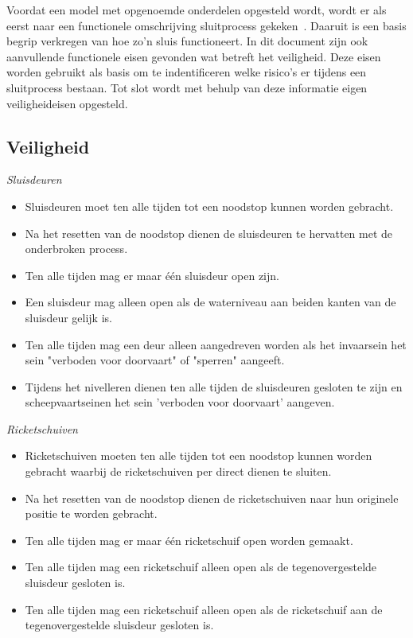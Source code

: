 \documentclass{article}
\begin{document}
    \noindent Voordat een model met opgenoemde onderdelen opgesteld wordt, wordt er als 
    eerst naar een functionele omschrijving sluitprocess gekeken~\cite{functioneel}. 
    Daaruit is een basis begrip verkregen van hoe zo'n sluis functioneert. In dit
    document zijn ook aanvullende functionele eisen gevonden wat betreft het 
    veiligheid. Deze eisen worden gebruikt als basis om te indentificeren welke 
    risico's er tijdens een sluitprocess bestaan. Tot slot wordt met behulp van
    deze informatie eigen veiligheideisen opgesteld.
    
    \subsection{Veiligheid}
        \textit{Sluisdeuren}
        \begin{itemize}
            \item Sluisdeuren moet ten alle tijden tot een noodstop kunnen worden
            gebracht.
            \item Na het resetten van de noodstop dienen de sluisdeuren te hervatten
            met de onderbroken process.
            \item Ten alle tijden mag er maar één sluisdeur open zijn.
            \item Een sluisdeur mag alleen open als de waterniveau aan beiden 
            kanten van de sluisdeur gelijk is.
            \item Ten alle tijden mag een deur alleen aangedreven worden als het
            invaarsein het sein "verboden voor doorvaart" of "sperren" aangeeft.
            \item Tijdens het nivelleren dienen ten alle tijden de sluisdeuren 
            gesloten te zijn en scheepvaartseinen het sein 'verboden voor doorvaart' 
            aangeven.
        \end{itemize}

        \noindent\textit{Ricketschuiven}
        \begin{itemize}
            \item Ricketschuiven moeten ten alle tijden tot een noodstop kunnen worden 
            gebracht waarbij de ricketschuiven per direct dienen te sluiten.
            \item Na het resetten van de noodstop dienen de ricketschuiven naar 
            hun originele positie te worden gebracht.
            \item Ten alle tijden mag er maar één ricketschuif open worden gemaakt.
            \item Ten alle tijden mag een ricketschuif alleen open als de tegenovergestelde
            sluisdeur gesloten is.
            \item Ten alle tijden mag een ricketschuif alleen open als de ricketschuif
            aan de tegenovergestelde sluisdeur gesloten is.
        \end{itemize}
\end{document}
